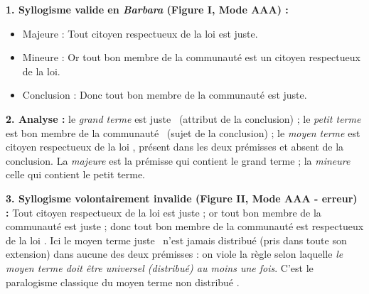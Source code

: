 \documentclass[11pt]{article}
\begin{document}
\begin{corrige}
\textbf{1. Syllogisme valide en \emph{Barbara} (Figure I, Mode AAA) :}
\begin{itemize}
\item Majeure : Tout citoyen respectueux de la loi est juste.
\item Mineure : Or tout bon membre de la communauté est un citoyen respectueux de la loi.
\item Conclusion : Donc tout bon membre de la communauté est juste.
\end{itemize}

\textbf{2. Analyse :} le \emph{grand terme} est \guillemotleft juste \guillemotright\ (attribut de la conclusion) ; le \emph{petit terme} est \guillemotleft bon membre de la communauté \guillemotright\ (sujet de la conclusion) ; le \emph{moyen terme} est \guillemotleft citoyen respectueux de la loi \guillemotright, présent dans les deux prémisses et absent de la conclusion. La \emph{majeure} est la prémisse qui contient le grand terme ; la \emph{mineure} celle qui contient le petit terme.

\textbf{3. Syllogisme volontairement invalide (Figure II, Mode AAA - erreur) :} \guillemotleft Tout citoyen respectueux de la loi est juste ; or tout bon membre de la communauté est juste ; donc tout bon membre de la communauté est respectueux de la loi \guillemotright. Ici le moyen terme \guillemotleft juste \guillemotright\ n'est jamais distribué (pris dans toute son extension) dans aucune des deux prémisses : on viole la règle selon laquelle \emph{le moyen terme doit être universel (distribué) au moins une fois}. C'est le paralogisme classique du \guillemotleft moyen terme non distribué \guillemotright.
\end{corrige}
\end{document}
